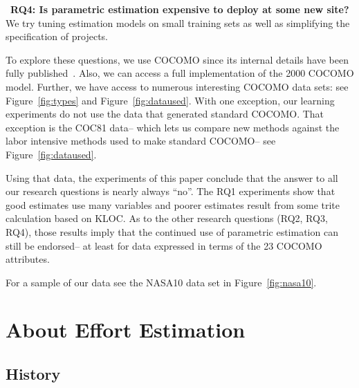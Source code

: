 \documentclass[smallcondesed]{svjour3}
\newcommand{\fig}[1]{Figure~\ref{fig:#1}}
\newenvironment{BLUE}{\color{blue}}{\ignorespacesafterend}
\newcommand{\HERE}[1]{\label{err:#1}
 \reversemarginpar\marginnote{\textcolor{blue}{(#1)}}}
\begin{document}
~{\bf RQ4: Is parametric estimation expensive to deploy  at some new site?}
We try   tuning estimation models on  small training sets 
as well as simplifying the specification of  projects.

 
 
To explore these questions, we use  COCOMO since its
internal details have been fully
published~\cite{boehm00b}. Also, we can access a full implementation of the  2000
COCOMO model.
Further, we have access to numerous interesting  COCOMO data
sets: see \fig{types} and \fig{dataused}.
\begin{BLUE}
\HERE{Reviewer2a}
With one exception, our learning experiments do not use the data
that generated   standard COCOMO.
That exception is the  COC81 data-- which  lets us  compare new methods
against the  labor intensive methods used to make standard COCOMO-- see 
\fig{dataused}.
\end{BLUE}
 
 
Using that data,  the experiments of this paper conclude that
the answer to all  our  research questions is nearly always
``no''.  
The RQ1 experiments show that good estimates use many variables
and  poorer estimates result from   some trite calculation based on KLOC.   
%
As to the other research questions (RQ2, RQ3, RQ4), those results imply that 
the continued
use of parametric estimation can still be endorsed-- at least for data expressed
in terms of the 23 COCOMO attributes. 

For a sample of our data  see the NASA10 data set in \fig{nasa10}.

 \section{About Effort Estimation}
 \subsection{History}
\end{document}
